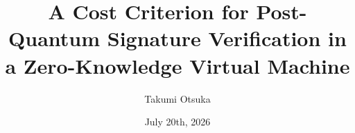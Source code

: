 \documentclass[dvipdfmx, a4j, 12pt]{article}
\date{July 20th, 2026}
\title{A Cost Criterion for Post-Quantum Signature Verification in a Zero-Knowledge Virtual Machine}
\author{Takumi Otsuka}
\theoremstyle{definition}
\theoremstyle{remark}
\begin{document}
    \maketitle
    
    \begin{coverabstract}


\end{coverabstract}
\end{document}
